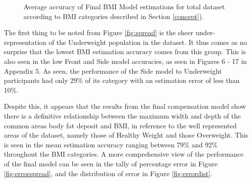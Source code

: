 \documentclass[conference]{IEEEtran}
\begin{document}
\begin{figure}
\begin{minipage}[b]{0.235\textwidth}
	\caption{Average accuracy of Final BMI Model estimations for total dataset according to BMI categories described in Section \ref{concept}).}
	\label{fig:accuracies}
    \end{minipage}
\end{figure}

The first thing to be noted from Figure \ref{fig:spread} is the sheer under-representation of the Underweight population in the dataset.
It thus comes as no surprise that the lowest BMI estimation accuracy comes from this group.
This is also seen in the low Front and Side model accuracies, as seen in Figures 6 - 17 in Appendix 5.
As seen, the performance of the Side model to Underweight participants had only 29\% of its category with an estimation error of less than 10\%.

Despite this, it appears that the results from the final compensation model show there is a definitive relationship between the maximum width and depth of the common areas body fat deposit and BMI, in reference to the well represented areas of the dataset, namely those of Healthy Weight and those Overweight.
This is seen in the mean estimation accuracy ranging between 79\% and 92\% throughout the BMI categories.
A more comprehensive view of the performance of the final model can be seen in the tally of percentage error in Figure \ref{fig:errorspread}, and the distribution of error in Figure \ref{fig:errordist}.
\end{document}
